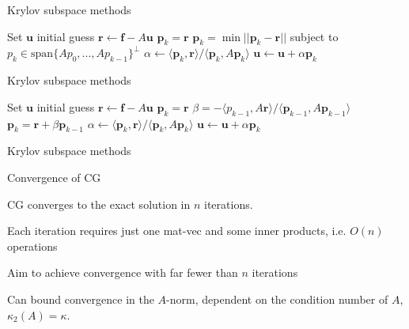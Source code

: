 \documentclass[18pt,xcolor=table]{beamer}
\begin{document}
\begin{frame}{Krylov subspace methods}
\begin{algorithm}[H]
\caption{Conjugate Gradient (idea)}
\begin{algorithmic}
\State Set $\mathbf{u}$ initial guess
\State $\mathbf{r} \leftarrow \mathbf{f} - A\mathbf{u}$
\State $\mathbf{p}_k = \mathbf{r}$
\Else
\State $\mathbf{p}_k = \min||\mathbf{p}_k - \mathbf{r}||$ subject to $p_k\in\text{span}\{Ap_0,...,Ap_{k-1}\}^\perp$
\EndIf
\State $\alpha \leftarrow \langle \mathbf{p}_k, \mathbf{r} \rangle / \langle \mathbf{p}_k, A\mathbf{p}_k \rangle$
\State $\mathbf{u} \leftarrow \mathbf{u} + \alpha\mathbf{p}_k$
\EndFor
\end{algorithmic}
\end{algorithm}
\end{frame}

\begin{frame}{Krylov subspace methods}
\begin{algorithm}[H]
\caption{Conjugate Gradient (CG)}
\begin{algorithmic}
\State Set $\mathbf{u}$ initial guess
\State $\mathbf{r} \leftarrow \mathbf{f} - A\mathbf{u}$
\State $\mathbf{p}_k = \mathbf{r}$
\Else
\State $\beta  = -\langle p_{k-1}, A\mathbf{r} \rangle / \langle \mathbf{p}_{k-1}, A\mathbf{p}_{k-1} \rangle$
\State $\mathbf{p}_k = \mathbf{r} + \beta \mathbf{p}_{k-1}$
\EndIf
\State $\alpha \leftarrow \langle \mathbf{p}_k, \mathbf{r} \rangle / \langle \mathbf{p}_k, A\mathbf{p}_k \rangle$
\State $\mathbf{u} \leftarrow \mathbf{u} + \alpha\mathbf{p}_k$
\EndFor
\end{algorithmic}
\end{algorithm}
\end{frame}

\begin{frame}{Krylov subspace methods}
\begin{block}{Convergence of CG}
\bit
\item CG converges to the exact solution in $n$ iterations.
\item Each iteration requires just one mat-vec and some inner products, i.e. $O(n)$ operations
\item Aim to achieve convergence with far fewer than $n$ iterations
\item Can bound convergence in the $A$-norm, dependent on the condition number of $A$, $\kappa_2(A) = \kappa$.
\eit
{}
\end{block}
\end{frame}
\end{document}
